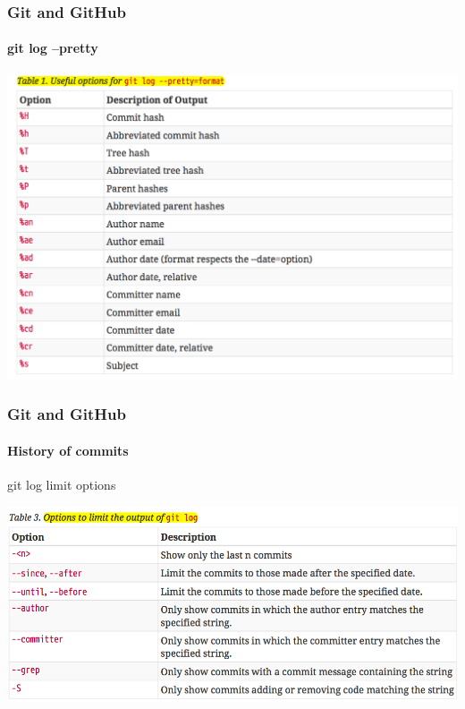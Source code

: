 \begin{frame}
	\frametitle{Git and GitHub}
    \framesubtitle{git log --pretty}
    \addtocounter{nframe}{1}


		\begin{center}
			\includegraphics[width=.9\textwidth]{imgs/git-log-pretty.png}
		\end{center}

\end{frame}

\begin{frame}
	\frametitle{Git and GitHub}
    \framesubtitle{History of commits}
    \addtocounter{nframe}{1}

	\begin{block}{git log limit options}
		\begin{center}
			\includegraphics[width=.95\textwidth]{imgs/git-log-limits.png}
		\end{center}
	\end{block}

\end{frame}

